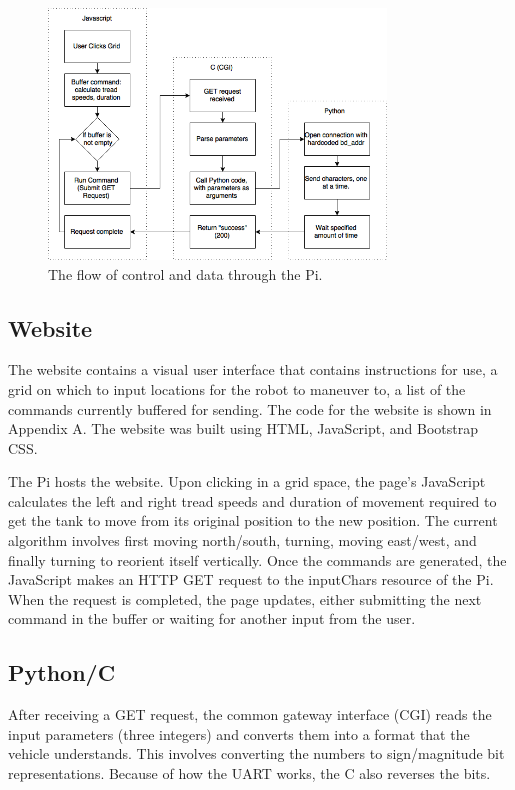 \documentclass[12pt]{article}
\begin{document}
\begin{figure}
\begin{center}
\includegraphics[width=0.8\textwidth]{PiRoutines}
\end{center}
\caption{The flow of control and data through the Pi.}
\label{fig:piroutines}
\end{figure}

\subsection{Website}

The website contains a visual user interface that contains instructions for use, a grid on which to input locations for the robot to maneuver to, a list of the commands currently buffered for sending. The code for the website is shown in Appendix A. The website was built using HTML, JavaScript, and Bootstrap CSS. 

The Pi hosts the website. Upon clicking in a grid space, the page's JavaScript calculates the left and right tread speeds and duration of movement required to get the tank to move from its original position to the new position. The current algorithm involves first moving north/south, turning, moving east/west, and finally turning to reorient itself vertically. Once the commands are generated, the JavaScript makes an HTTP GET request to the inputChars resource of the Pi. When the request is completed, the page updates, either submitting the next command in the buffer or waiting for another input from the user.

\subsection{Python/C}
After receiving a GET request, the common gateway interface (CGI) reads the input parameters (three integers) and converts them into a format that the vehicle understands. This involves converting the numbers to sign/magnitude bit representations. Because of how the UART works, the C also reverses the bits.
\end{document}
